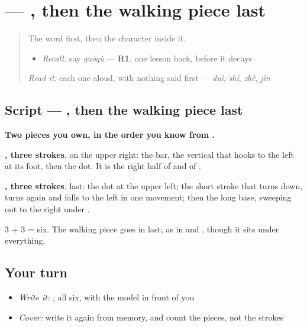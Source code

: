 \section[\texorpdfstring{\zh{过} (guò)}{过 (guò)}]{ — , then the walking piece last}

\label{lesson:ZH-W150-guo-pass}



\begin{quote}
The word first, then the character inside it.

\begin{itemize}
\raggedright
  \item \emph{Recall:} say \emph{guòqù} — \textbf{R1}, one lesson back, before it decays
\end{itemize}

\begin{quote}
   
\end{quote}

\emph{Read it:} each one aloud, with nothing said first — \emph{duì}, \emph{shí}, \emph{zhè}, \emph{jìn}
\end{quote}

\subsection*{Script — , then the walking piece last}

\begin{quote}
\end{quote}

\textbf{Two pieces you own, in the order you know from .}

\textbf{, three strokes}, on the upper right: the bar, the vertical that hooks to the left at its foot, then the dot. It is the right half of  and of .

\textbf{, three strokes}, last: the dot at the upper left; the short stroke that turns down, turns again and falls to the left in one movement; then the long base, sweeping out to the right under .

3 + 3 = six. The walking piece goes in last, as in  and , though it sits under everything.

\subsection*{Your turn}
\begin{itemize}
\raggedright
  \item \emph{Write it:} , all six, with the model in front of you
  \item \emph{Cover:} write it again from memory, and count the pieces, not the strokes
\end{itemize}

